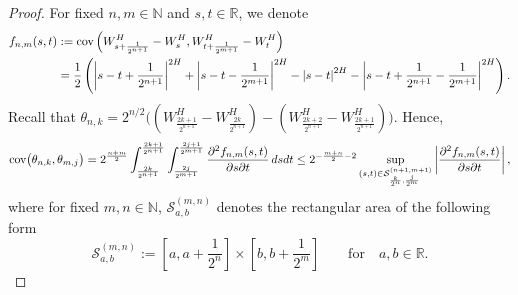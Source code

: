 \documentclass[12pt,reqno]{article}
\numberwithin{equation}{section}
\def\cov{\mbox{cov}}
\def\var{\mbox{var}}
\theoremstyle{definition}
\def\cov{\hbox{\rm cov}}\def\var{\text{\rm Var}}
\newcommand{\calS}{\mathcal{S}}
\newcommand{\bR}{\mathbb{R}}
\newcommand{\bN}{\mathbb{N}}
\begin{document}
\begin{proof}
	For fixed $n,m \in \bN$ and $s,t \in \bR$, we denote
	\begin{equation}\label{eq fnm}
		\begin{split}
			f_{n,m}(s,t) &:= \cov\left(W^H_{s + \frac{1}{2^{n+1}}} - W^H_s, W^H_{t + \frac{1}{2^{m+1}}} - W^H_t \right)\\&= \frac{1}{2}\left(\left|s-t+\frac{1}{2^{n+1}}\right|^{2H}+\left|s-t-\frac{1}{2^{m+1}}\right|^{2H}-\left|s-t\right|^{2H}-\left|s-t+\frac{1}{2^{n+1}}-\frac{1}{2^{m+1}}\right|^{2H}\right).
		\end{split}
	\end{equation}
	Recall that $\theta_{n,k} = 2^{n/2}\big((W^H_{\frac{2k+1}{2^{n+1}}} - W^H_{\frac{2k}{2^{n+1}}})-(W^H_{\frac{2k+2}{2^{n+1}}} - W^H_{\frac{2k+1}{2^{n+1}}})\big)$. Hence,	\begin{equation}\label{eq partial bound}
				\cov\big(\theta_{n,k},\theta_{m,j}\big)= 2^{\frac{n+m}{2}}\int_{\frac{2k}{2^{n+1}}}^{\frac{2k+1}{2^{n+1}}}\int_{\frac{2j}{2^{m+1}}}^{\frac{2j+1}{2^{m+1}}}\frac{\partial^2 f_{n,m}(s,t)}{\partial s \partial t}\,dsdt \le 2^{-\frac{m+n}{2}-2}\sup_{(s,t) \in \calS^{(n+1,m+1)}_{\frac{k}{2^n},\frac{j}{2^m}}}\left|\frac{\partial^2 f_{n,m}(s,t)}{\partial s \partial t}\right|,
	\end{equation}
	where for fixed $m,n \in \bN$, $\calS^{(m,n)}_{a,b}$ denotes the rectangular area of the following form $$\calS^{(m,n)}_{a,b}:= \left[a, a + \frac{1}{2^{n}}\right] \times \left[b, b+\frac{1}{2^{m}}\right] \qquad \text{for} \quad a,b \in \bR.$$
	

\end{proof}
\end{document}
